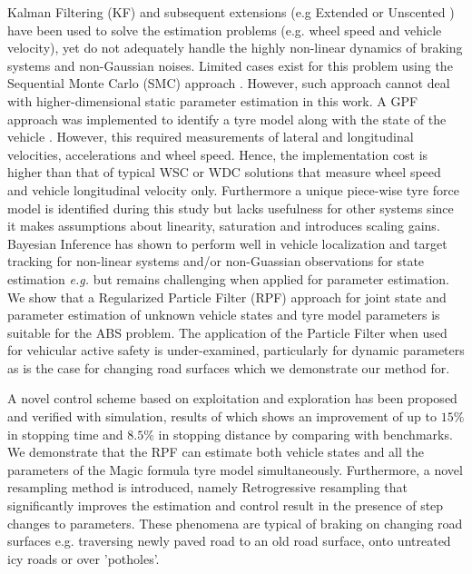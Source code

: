 \documentclass[onecolumn,journal,draftclsnofoot]{IEEEtran}
\begin{document}
Kalman Filtering (KF) and subsequent extensions (e.g Extended \cite{Zhang2014,Wenzel2007,Li2021} or Unscented \cite{Bogdanski2017,Chen2016,Qin2022}) have been used to solve the estimation problems (e.g. wheel speed and vehicle velocity), yet do not adequately handle the highly non-linear dynamics of braking systems and non-Gaussian noises.
Limited cases exist for this problem using the Sequential Monte Carlo (SMC) approach \cite{Bogdanski2017}. %
However, such approach cannot deal with higher-dimensional static parameter estimation in this work. 
A GPF approach was implemented to identify a tyre model along with the state of the vehicle \cite{Wang2020}. 
However, this required measurements of lateral and longitudinal velocities, accelerations and wheel speed. 
Hence, the implementation  cost is higher than that of typical WSC or WDC solutions that measure wheel speed and vehicle longitudinal velocity only. 
Furthermore a unique piece-wise tyre force model is identified during this study but lacks usefulness for other systems since it makes assumptions about linearity, saturation and introduces scaling gains. 
Bayesian Inference has shown to perform well in vehicle localization and target tracking for non-linear systems and/or non-Guassian observations for state estimation {\emph{e.g.}\cite{Wenzel2007,Huang2018}} but remains challenging when applied for parameter estimation. We show that a Regularized Particle Filter (RPF) approach for joint state and parameter estimation of unknown vehicle states and tyre model parameters is suitable for the ABS problem. 
The application of the Particle Filter when used for vehicular active safety is under-examined, particularly for dynamic parameters as is the case for changing road surfaces which we demonstrate our method for.


A novel control scheme based on exploitation and exploration has been proposed and verified with simulation, results of which shows an improvement of up to $15\%$ in stopping time and $8.5\%$ in stopping distance by comparing with benchmarks.
We demonstrate that the RPF can estimate both vehicle states and all the parameters of the Magic formula tyre model simultaneously. Furthermore, a novel resampling method is introduced, namely Retrogressive resampling that significantly improves the estimation and control result in the presence of step changes to parameters. These phenomena are typical of braking on changing road surfaces e.g. traversing newly paved road to an old road surface, onto untreated icy roads or over 'potholes'.
\end{document}
